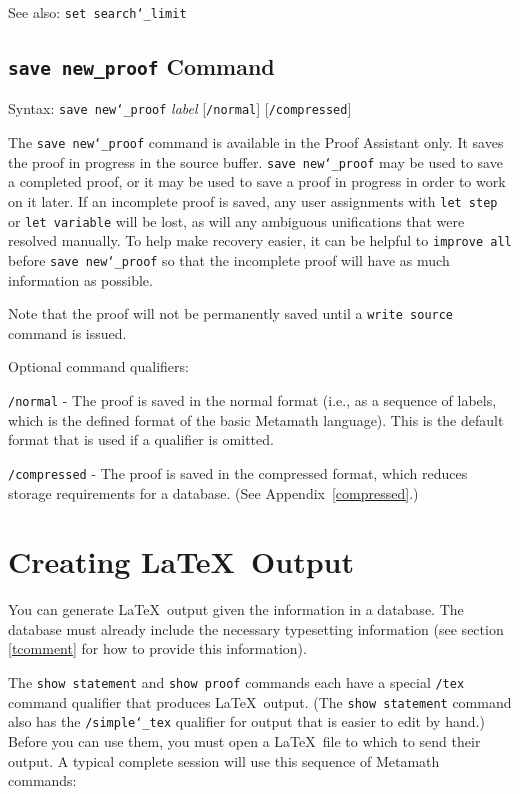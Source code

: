 See also: \texttt{set search{\char`\_}limit}

\subsection{\texttt{save new\_proof} Command}
Syntax:  \texttt{save new{\char`\_}proof} {\em label} [\texttt{/normal}]
   [\texttt{/compressed}]

The \texttt{save new{\char`\_}proof} command is available in the Proof
Assistant only.  It saves the proof in progress in the source
buffer.  \texttt{save new{\char`\_}proof} may be
used to save a completed proof, or it may be used to save a proof in
progress in order to work on it later.  If an incomplete proof is saved,
any user assignments with \texttt{let step} or \texttt{let variable}
will be lost, as will any ambiguous unifications that were resolved manually.
To help make recovery easier, it can be helpful to \texttt{improve all}
before \texttt{save new{\char`\_}proof} so that the incomplete proof
will have as much information as possible.

Note that the proof will not be permanently saved until a \texttt{write
source} command is issued.

Optional command qualifiers:

    \texttt{/normal} - The proof is saved in the normal format (i.e., as a
        sequence of labels, which is the defined format of the basic Metamath
        language).  This is the default format that
        is used if a qualifier is omitted.

    \texttt{/compressed} - The proof is saved in the compressed format, which
        reduces storage requirements for a database.
        (See Appendix~\ref{compressed}.)


\section{Creating \LaTeX\ Output}\label{texout}

You can generate \LaTeX\ output given the
information in a database.
The database must already include the necessary typesetting information
(see section \ref{tcomment} for how to provide this information).

The \texttt{show statement} and \texttt{show proof} commands each have a
special \texttt{/tex} command qualifier that produces \LaTeX\ output.
(The \texttt{show statement} command also has the
\texttt{/simple{\char`\_}tex} qualifier for output that is easier to
edit by hand.)  Before you can use them, you must open a \LaTeX\ file to
which to send their output.  A typical complete session will use this
sequence of Metamath commands:

